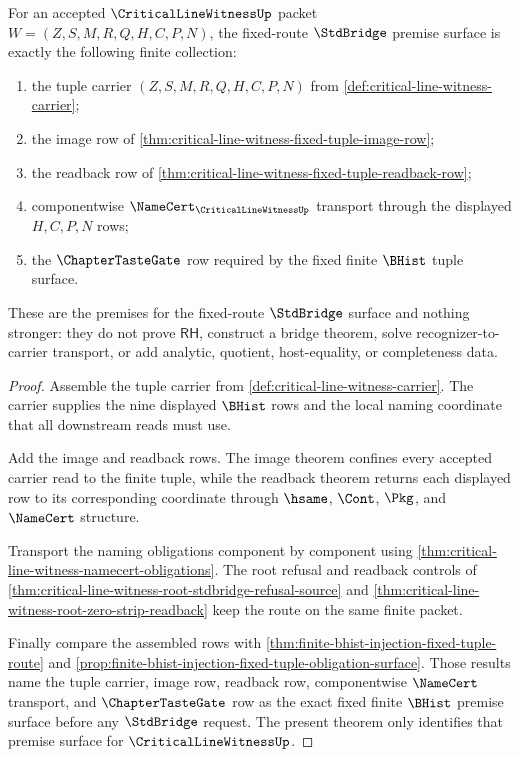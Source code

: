 \begin{theorem}
\label{thm:critical-line-witness-stdbridge-premise-surface}
For an accepted $\CriticalLineWitnessUp$ packet $W=(Z,S,M,R,Q,H,C,P,N)$, the fixed-route $\StdBridge$ premise surface is exactly the following finite collection:
\begin{enumerate}
\item the tuple carrier $(Z,S,M,R,Q,H,C,P,N)$ from \autoref{def:critical-line-witness-carrier};
\item the image row of \autoref{thm:critical-line-witness-fixed-tuple-image-row};
\item the readback row of \autoref{thm:critical-line-witness-fixed-tuple-readback-row};
\item componentwise $\NameCert_{\CriticalLineWitnessUp}$ transport through the displayed $H,C,P,N$ rows;
\item the $\ChapterTasteGate$ row required by the fixed finite $\BHist$ tuple surface.
\end{enumerate}
These are the premises for the fixed-route $\StdBridge$ surface and nothing stronger: they do not prove $\mathsf{RH}$, construct a bridge theorem, solve recognizer-to-carrier transport, or add analytic, quotient, host-equality, or completeness data.
\end{theorem}
\begin{proof}
Assemble the tuple carrier from \autoref{def:critical-line-witness-carrier}. The carrier supplies the nine displayed $\BHist$ rows and the local naming coordinate that all downstream reads must use.

Add the image and readback rows. The image theorem confines every accepted carrier read to the finite tuple, while the readback theorem returns each displayed row to its corresponding coordinate through $\hsame$, $\Cont$, $\Pkg$, and $\NameCert$ structure.

Transport the naming obligations component by component using \autoref{thm:critical-line-witness-namecert-obligations}. The root refusal and readback controls of \autoref{thm:critical-line-witness-root-stdbridge-refusal-source} and \autoref{thm:critical-line-witness-root-zero-strip-readback} keep the route on the same finite packet.

Finally compare the assembled rows with \autoref{thm:finite-bhist-injection-fixed-tuple-route} and \autoref{prop:finite-bhist-injection-fixed-tuple-obligation-surface}. Those results name the tuple carrier, image row, readback row, componentwise $\NameCert$ transport, and $\ChapterTasteGate$ row as the exact fixed finite $\BHist$ premise surface before any $\StdBridge$ request. The present theorem only identifies that premise surface for $\CriticalLineWitnessUp$.
\end{proof}
